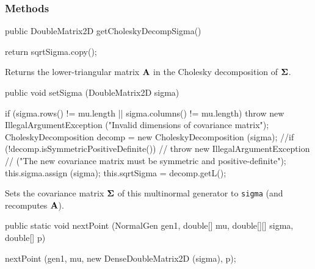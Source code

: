 \subsubsection*{Methods}

\begin{code}

   public DoubleMatrix2D getCholeskyDecompSigma()\begin{hide} {
      return sqrtSigma.copy();
   }\end{hide}
\end{code}
\begin{tabb}   Returns the lower-triangular matrix $\textbf{A}$ in the
 Cholesky decomposition of $\boldsymbol{\Sigma}$.
\end{tabb}
\begin{htmlonly}
\end{htmlonly}
\begin{code}

   public void setSigma (DoubleMatrix2D sigma)\begin{hide} {
      if (sigma.rows() != mu.length || sigma.columns() != mu.length)
         throw new IllegalArgumentException
            ("Invalid dimensions of covariance matrix");
      CholeskyDecomposition decomp = new CholeskyDecomposition (sigma);
      //if (!decomp.isSymmetricPositiveDefinite())
      //   throw new IllegalArgumentException
      //      ("The new covariance matrix must be symmetric and positive-definite");
      this.sigma.assign (sigma);
      this.sqrtSigma = decomp.getL();
   }\end{hide}
\end{code}
\begin{tabb} Sets the covariance matrix $\boldsymbol{\Sigma}$ of this multinormal generator
 to \texttt{sigma} (and recomputes $\textbf{A}$).
\end{tabb}
\begin{htmlonly}
\end{htmlonly}
\begin{code}

   public static void nextPoint (NormalGen gen1, double[] mu,
                                 double[][] sigma, double[] p)\begin{hide} {
      nextPoint (gen1, mu, new DenseDoubleMatrix2D (sigma), p);
   }\end{hide}
\end{code}
